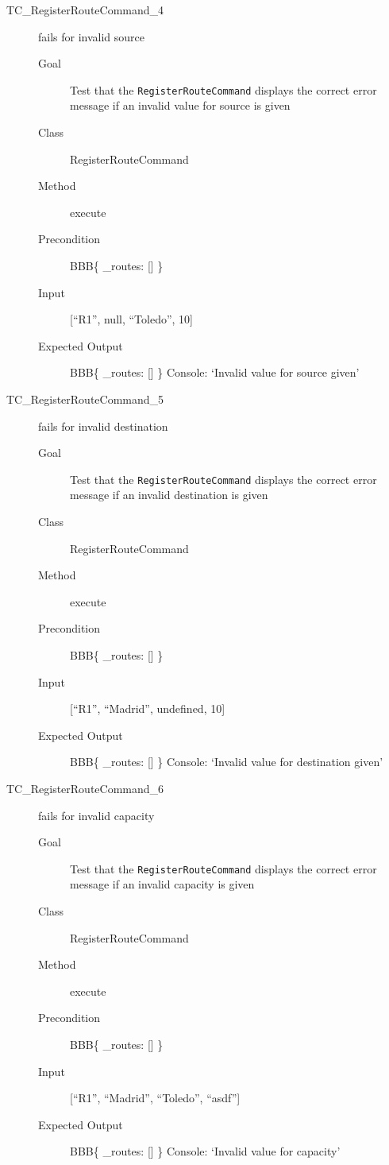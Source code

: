 \documentclass[11pt]{article}
\begin{document}
\begin{description}
\item[{TC\_RegisterRouteCommand\_4}] fails for invalid source
\begin{description}
\item[{Goal}] Test that the \texttt{RegisterRouteCommand} displays the correct error message if an invalid value for source is given
\item[{Class}] RegisterRouteCommand
\item[{Method}] execute
\item[{Precondition}] BBB\{ \_routes: [] \}
\item[{Input}] [“R1”, null, “Toledo”, 10]
\item[{Expected Output}] BBB\{ \_routes: [] \}
Console: ‘Invalid value for source given’
\end{description}

\item[{TC\_RegisterRouteCommand\_5}] fails for invalid destination
\begin{description}
\item[{Goal}] Test that the \texttt{RegisterRouteCommand} displays the correct error message if an invalid destination is given
\item[{Class}] RegisterRouteCommand
\item[{Method}] execute
\item[{Precondition}] BBB\{ \_routes: [] \}
\item[{Input}] [“R1”, “Madrid”, undefined, 10]
\item[{Expected Output}] BBB\{ \_routes: [] \}
Console: ‘Invalid value for destination given’
\end{description}

\item[{TC\_RegisterRouteCommand\_6}] fails for invalid capacity
\begin{description}
\item[{Goal}] Test that the \texttt{RegisterRouteCommand} displays the correct error message if an invalid capacity is given
\item[{Class}] RegisterRouteCommand
\item[{Method}] execute
\item[{Precondition}] BBB\{ \_routes: [] \}
\item[{Input}] [“R1”, “Madrid”, “Toledo”, “asdf”]
\item[{Expected Output}] BBB\{ \_routes: [] \}
Console: ‘Invalid value for capacity’
\end{description}


\end{description}
\end{document}
